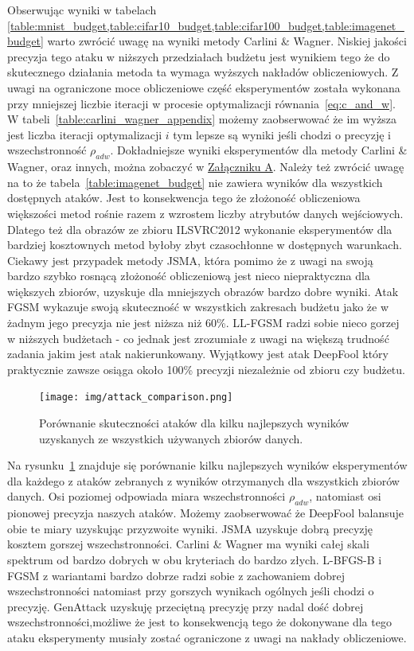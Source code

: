 \documentclass[
    left=2.5cm,         %
    right=2.5cm,        %
    top=2.5cm,          %
    bottom=3cm,         %
    bindingoffset=6mm,  %
    nohyphenation=false %
]{eiti/eiti-thesis}
\begin{document}
Obserwując wyniki w tabelach \cref{table:mnist_budget,table:cifar10_budget,table:cifar100_budget,table:imagenet_budget} warto zwrócić uwagę na wyniki metody Carlini \& Wagner.
Niskiej jakości precyzja tego ataku w niższych przedziałach budżetu jest wynikiem tego że do skutecznego działania metoda ta wymaga wyższych nakładów obliczeniowych.
Z uwagi na ograniczone moce obliczeniowe część eksperymentów została wykonana przy mniejszej liczbie iteracji w procesie optymalizacji równania~\eqref{eq:c_and_w}.
W tabeli~\ref{table:carlini_wagner_appendix} możemy zaobserwować że im wyższa jest liczba iteracji optymalizacji $i$ tym lepsze są wyniki jeśli chodzi o precyzję i wszechstronność $\rho_{adw}$.
Dokładniejsze wyniki eksperymentów dla metody Carlini \& Wagner, oraz innych, można zobaczyć w \hyperlink{appendix_tables}{Załączniku A}.
Należy też zwrócić uwagę na to że tabela~\ref{table:imagenet_budget} nie zawiera wyników dla wszystkich dostępnych ataków.
Jest to konsekwencja tego że złożoność obliczeniowa większości metod rośnie razem z wzrostem liczby atrybutów danych wejściowych.
Dlatego też dla obrazów ze zbioru ILSVRC2012 wykonanie eksperymentów dla bardziej kosztownych metod byłoby zbyt czasochłonne w dostępnych warunkach.
Ciekawy jest przypadek metody JSMA, która pomimo że z uwagi na swoją bardzo szybko rosnącą złożoność obliczeniową jest nieco niepraktyczna dla większych zbiorów, uzyskuje dla mniejszych obrazów bardzo dobre wyniki.
Atak FGSM wykazuje swoją skuteczność w wszystkich zakresach budżetu jako że w żadnym jego precyzja nie jest niższa niż 60\%.
LL-FGSM radzi sobie nieco gorzej w niższych budżetach - co jednak jest zrozumiałe z uwagi na większą trudność zadania jakim jest atak nakierunkowany.
Wyjątkowy jest atak DeepFool który praktycznie zawsze osiąga około 100\% precyzji niezależnie od zbioru czy budżetu.
\begin{figure}[H]
    \texttt{[image: img/attack\_comparison.png]}
    \caption{Porównanie skuteczności ataków dla kilku najlepszych wyników uzyskanych ze wszystkich używanych zbiorów danych.}
    \label{fig:attack_comparison_plot}
    \hfill
\end{figure}

Na rysunku~\ref{fig:attack_comparison_plot} znajduje się porównanie kilku najlepszych wyników eksperymentów dla każdego z ataków zebranych z wyników otrzymanych dla wszystkich zbiorów danych.
Osi poziomej odpowiada miara wszechstronności $\rho_{adw}$, natomiast osi pionowej precyzja naszych ataków.
Możemy zaobserwować że DeepFool balansuje obie te miary uzyskując przyzwoite wyniki.
JSMA uzyskuje dobrą precyzję kosztem gorszej wszechstronności.
Carlini \& Wagner ma wyniki całej skali spektrum od bardzo dobrych w obu kryteriach do bardzo złych.
L-BFGS-B i FGSM z wariantami bardzo dobrze radzi sobie z zachowaniem dobrej wszechstronności natomiast
przy gorszych wynikach ogólnych jeśli chodzi o precyzję.
GenAttack uzyskuję przeciętną precyzję przy nadal dość dobrej wszechstronności,możliwe że jest to konsekwencją tego że dokonywane dla tego ataku eksperymenty musiały zostać ograniczone z uwagi na nakłady obliczeniowe.
\end{document}
